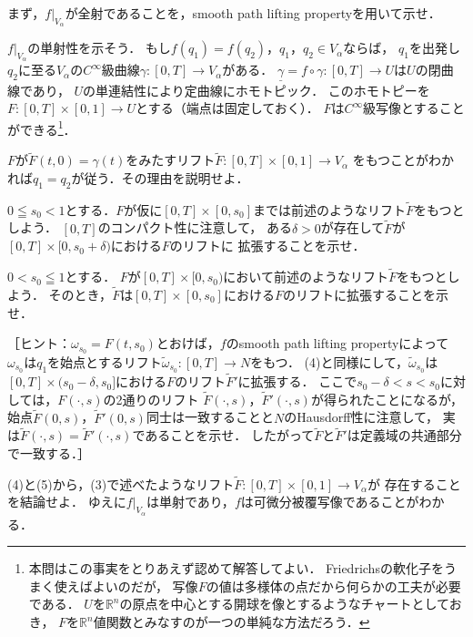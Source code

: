 \documentclass[uplatex,dvipdfmx,fontsize=12pt,jafontsize=11pt,line_length=42zw,number_of_lines=36,hanging_punctuation]{jlreq}
\begin{document}
\begin{enumerate-problems}
\begin{enumerate-subproblems}
				まず，$f|_{V_\alpha}$が全射であることを，smooth path lifting propertyを用いて示せ．
			\item
				$f|_{V_\alpha}$の単射性を示そう．
				もし$f(q_1)=f(q_2)$，$q_1$，$q_2\in V_\alpha$ならば，
				$q_1$を出発し$q_2$に至る$V_\alpha$の$C^\infty$級曲線$\gamma\colon[0,T]\to V_\alpha$がある．
				$\underline{\gamma}=f\circ\gamma\colon[0,T]\to U$は$U$の閉曲線であり，
				$U$の単連結性により定曲線にホモトピック．
				このホモトピーを$F\colon[0,T]\times[0,1]\to U$とする（端点は固定しておく）．
				$F$は$C^\infty$級写像とすることができる\footnote{本問はこの事実をとりあえず認めて解答してよい．
				Friedrichsの軟化子をうまく使えばよいのだが，
				写像$F$の値は多様体の点だから何らかの工夫が必要である．
				$U$を$\mathbb{R}^n$の原点を中心とする開球を像とするようなチャートとしておき，
				$F$を$\mathbb{R}^n$値関数とみなすのが一つの単純な方法だろう．}．

				$F$が$\tilde{F}(t,0)=\gamma(t)$をみたすリフト$\tilde{F}\colon[0,T]\times[0,1]\to V_\alpha$
				をもつことがわかれば$q_1=q_2$が従う．その理由を説明せよ．
			\item
				$0\leqq s_0<1$とする．$F$が仮に$[0,T]\times[0,s_0]$までは前述のようなリフト$\tilde{F}$をもつとしよう．
				$[0,T]$のコンパクト性に注意して，
				ある$\delta>0$が存在して$\tilde{F}$が$[0,T]\times[0,s_0+\delta)$における$F$のリフトに
				拡張することを示せ．
			\item
				$0<s_0\leqq 1$とする．
				$F$が$[0,T]\times[0,s_0)$において前述のようなリフト$\tilde{F}$をもつとしよう．
				そのとき，$\tilde{F}$は$[0,T]\times[0,s_0]$における$F$のリフトに拡張することを示せ．

				［ヒント：$\omega_{s_0}=F(t,s_0)$とおけば，$f$のsmooth path lifting propertyによって
				$\omega_{s_0}$は$q_1$を始点とするリフト$\tilde{\omega}_{s_0}\colon[0,T]\to N$をもつ．
				(4)と同様にして，$\tilde{\omega}_{s_0}$は
				$[0,T]\times(s_0-\delta,s_0]$における$F$のリフト$\tilde{F}'$に拡張する．
				ここで$s_0-\delta<s<s_0$に対しては，$F(\cdot,s)$の2通りのリフト
				$\tilde{F}(\cdot,s)$，$\tilde{F}'(\cdot,s)$が得られたことになるが，
				始点$\tilde{F}(0,s)$，$\tilde{F}'(0,s)$同士は一致することと$N$のHausdorff性に注意して，
				実は$\tilde{F}(\cdot,s)=\tilde{F}'(\cdot,s)$であることを示せ．
				したがって$\tilde{F}$と$\tilde{F}'$は定義域の共通部分で一致する．］
			\item
				(4)と(5)から，(3)で述べたようなリフト$\tilde{F}\colon[0,T]\times[0,1]\to V_\alpha$が
				存在することを結論せよ．
				ゆえに$f|_{V_\alpha}$は単射であり，$f$は可微分被覆写像であることがわかる．
		\end{enumerate-subproblems}
\end{enumerate-problems}
\end{document}
